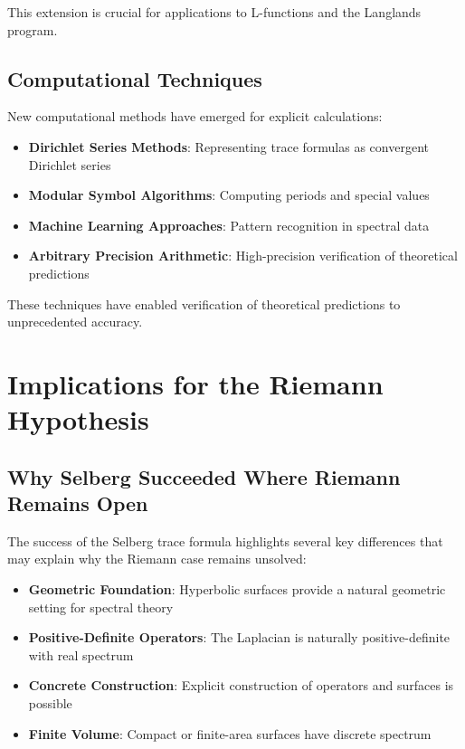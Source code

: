 This extension is crucial for applications to L-functions and the Langlands program.

\subsection{Computational Techniques}

New computational methods have emerged for explicit calculations:

\begin{itemize}
\item \textbf{Dirichlet Series Methods}: Representing trace formulas as convergent Dirichlet series \cite{bookerlee2016}
\item \textbf{Modular Symbol Algorithms}: Computing periods and special values
\item \textbf{Machine Learning Approaches}: Pattern recognition in spectral data
\item \textbf{Arbitrary Precision Arithmetic}: High-precision verification of theoretical predictions
\end{itemize}

These techniques have enabled verification of theoretical predictions to unprecedented accuracy.

\section{Implications for the Riemann Hypothesis}
\label{sec:rh_implications}

\subsection{Why Selberg Succeeded Where Riemann Remains Open}

The success of the Selberg trace formula highlights several key differences that may explain why the Riemann case remains unsolved:

\begin{itemize}
\item \textbf{Geometric Foundation}: Hyperbolic surfaces provide a natural geometric setting for spectral theory
\item \textbf{Positive-Definite Operators}: The Laplacian is naturally positive-definite with real spectrum
\item \textbf{Concrete Construction}: Explicit construction of operators and surfaces is possible
\item \textbf{Finite Volume}: Compact or finite-area surfaces have discrete spectrum
\end{itemize}


